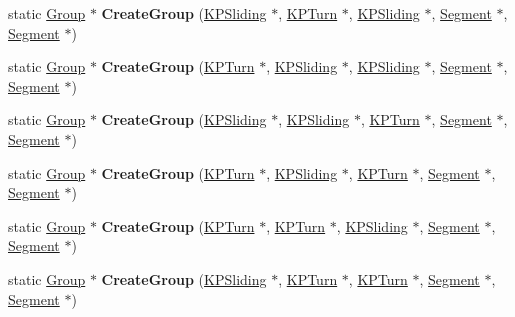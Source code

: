 \begin{DoxyCompactItemize}
\item 
\hypertarget{class_group_builder_ac79975a9418d7c35921d6411aecf93b1}{
static \hyperlink{class_group}{Group} $\ast$ {\bfseries CreateGroup} (\hyperlink{class_k_p_sliding}{KPSliding} $\ast$, \hyperlink{class_k_p_turn}{KPTurn} $\ast$, \hyperlink{class_k_p_sliding}{KPSliding} $\ast$, \hyperlink{class_segment}{Segment} $\ast$, \hyperlink{class_segment}{Segment} $\ast$)}
\label{class_group_builder_ac79975a9418d7c35921d6411aecf93b1}

\item 
\hypertarget{class_group_builder_a6a53e8270f1196a2bbbce15fc218b477}{
static \hyperlink{class_group}{Group} $\ast$ {\bfseries CreateGroup} (\hyperlink{class_k_p_turn}{KPTurn} $\ast$, \hyperlink{class_k_p_sliding}{KPSliding} $\ast$, \hyperlink{class_k_p_sliding}{KPSliding} $\ast$, \hyperlink{class_segment}{Segment} $\ast$, \hyperlink{class_segment}{Segment} $\ast$)}
\label{class_group_builder_a6a53e8270f1196a2bbbce15fc218b477}

\item 
\hypertarget{class_group_builder_a3d8071a7bfc2f44de4c9ae21e95e6900}{
static \hyperlink{class_group}{Group} $\ast$ {\bfseries CreateGroup} (\hyperlink{class_k_p_sliding}{KPSliding} $\ast$, \hyperlink{class_k_p_sliding}{KPSliding} $\ast$, \hyperlink{class_k_p_turn}{KPTurn} $\ast$, \hyperlink{class_segment}{Segment} $\ast$, \hyperlink{class_segment}{Segment} $\ast$)}
\label{class_group_builder_a3d8071a7bfc2f44de4c9ae21e95e6900}

\item 
\hypertarget{class_group_builder_ae8dfd280f077d042b8f41d4055cee858}{
static \hyperlink{class_group}{Group} $\ast$ {\bfseries CreateGroup} (\hyperlink{class_k_p_turn}{KPTurn} $\ast$, \hyperlink{class_k_p_sliding}{KPSliding} $\ast$, \hyperlink{class_k_p_turn}{KPTurn} $\ast$, \hyperlink{class_segment}{Segment} $\ast$, \hyperlink{class_segment}{Segment} $\ast$)}
\label{class_group_builder_ae8dfd280f077d042b8f41d4055cee858}

\item 
\hypertarget{class_group_builder_a0304efce375bfdac74a92ddc2414be03}{
static \hyperlink{class_group}{Group} $\ast$ {\bfseries CreateGroup} (\hyperlink{class_k_p_turn}{KPTurn} $\ast$, \hyperlink{class_k_p_turn}{KPTurn} $\ast$, \hyperlink{class_k_p_sliding}{KPSliding} $\ast$, \hyperlink{class_segment}{Segment} $\ast$, \hyperlink{class_segment}{Segment} $\ast$)}
\label{class_group_builder_a0304efce375bfdac74a92ddc2414be03}

\item 
\hypertarget{class_group_builder_a364c223dada7c2b5e5e6f838a4c8cf39}{
static \hyperlink{class_group}{Group} $\ast$ {\bfseries CreateGroup} (\hyperlink{class_k_p_sliding}{KPSliding} $\ast$, \hyperlink{class_k_p_turn}{KPTurn} $\ast$, \hyperlink{class_k_p_turn}{KPTurn} $\ast$, \hyperlink{class_segment}{Segment} $\ast$, \hyperlink{class_segment}{Segment} $\ast$)}
\label{class_group_builder_a364c223dada7c2b5e5e6f838a4c8cf39}


\end{DoxyCompactItemize}
